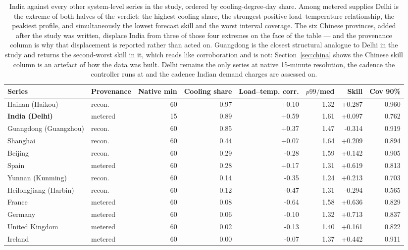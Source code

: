 \begin{table}[t]
\centering
\footnotesize
\setlength{\tabcolsep}{3.5pt}
\begin{tabular}{llrrrrrr}
\toprule
Series & Provenance & Native min & Cooling share & Load--temp. corr. & $p99/$med & Skill & Cov 90\% \\
\midrule
Hainan (Haikou) & recon. & 60 & 0.97 & +0.10 & 1.32 & +0.287 & 0.960 \\
\textbf{India (Delhi)} & metered & 15 & 0.89 & +0.59 & 1.61 & +0.097 & 0.762 \\
Guangdong (Guangzhou) & recon. & 60 & 0.85 & +0.37 & 1.47 & -0.314 & 0.919 \\
Shanghai & recon. & 60 & 0.44 & +0.07 & 1.64 & +0.209 & 0.894 \\
Beijing & recon. & 60 & 0.29 & -0.28 & 1.59 & +0.142 & 0.905 \\
Spain & metered & 60 & 0.28 & +0.17 & 1.31 & +0.619 & 0.813 \\
Yunnan (Kunming) & recon. & 60 & 0.14 & -0.35 & 1.24 & +0.213 & 0.703 \\
Heilongjiang (Harbin) & recon. & 60 & 0.12 & -0.47 & 1.31 & -0.294 & 0.565 \\
France & metered & 60 & 0.08 & -0.64 & 1.58 & +0.636 & 0.829 \\
Germany & metered & 60 & 0.06 & -0.10 & 1.32 & +0.713 & 0.837 \\
United Kingdom & metered & 60 & 0.02 & -0.13 & 1.40 & +0.161 & 0.822 \\
Ireland & metered & 60 & 0.00 & -0.07 & 1.37 & +0.442 & 0.911 \\
\bottomrule
\end{tabular}
\caption{India against every other system-level series in the study, ordered by cooling-degree-day share. Among metered supplies Delhi is the extreme of both halves of the verdict: the highest cooling share, the strongest positive load--temperature relationship, the peakiest profile, and simultaneously the lowest forecast skill and the worst interval coverage. The six Chinese provinces, added after the study was written, displace India from three of those four extremes on the face of the table --- and the provenance column is why that displacement is reported rather than acted on. Guangdong is the closest structural analogue to Delhi in the study and returns the second-worst skill in it, which reads like corroboration and is not: Section~\ref{sec:china} shows the Chinese skill column is an artefact of how the data was built. Delhi remains the only series at native 15-minute resolution, the cadence the controller runs at and the cadence Indian demand charges are assessed on.}
\label{tab:india}
\end{table}
